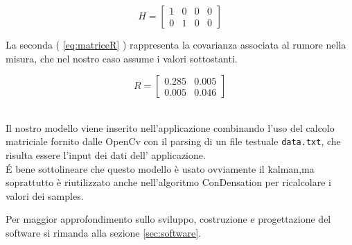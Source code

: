 \begin{equation} \label{eq:matriceH}
 H = \begin{bmatrix} 
1 & 0 & 0 & 0\\
0 & 1 & 0 & 0
\end{bmatrix}
\end{equation}


La seconda ( \ref{eq:matriceR} ) rappresenta la covarianza associata al rumore nella misura, che nel nostro caso assume i valori sottostanti.


\begin{equation}\label{eq:matriceR}
 R = \begin{bmatrix} 
0.285 & 0.005\\
0.005 & 0.046
\end{bmatrix} 
\end{equation}

~\\
Il nostro modello viene inserito nell'applicazione combinando l'uso del calcolo matriciale fornito dalle OpenCv con il parsing di un file testuale \texttt{data.txt}, che risulta essere l'input dei dati dell' applicazione.\\
\'E bene sottolineare che questo modello è usato ovviamente il kalman,ma soprattutto è riutilizzato anche nell'algoritmo ConDensation per ricalcolare i valori dei samples.


Per maggior approfondimento sullo sviluppo, costruzione e progettazione del software si rimanda alla sezione \ref{sec:software}.
